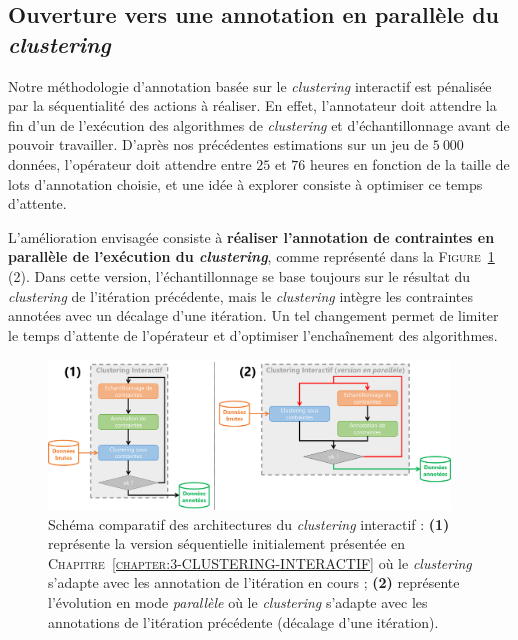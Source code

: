 		\subsection{Ouverture vers une annotation en parallèle du \textit{clustering}}
		
			Notre méthodologie d'annotation basée sur le \textit{clustering} interactif est pénalisée par la séquentialité des actions à réaliser.
			En effet, l'annotateur doit attendre la fin d'un de l'exécution des algorithmes de \textit{clustering} et d'échantillonnage avant de pouvoir travailler.
			D'après nos précédentes estimations sur un jeu de $5~000$ données, l'opérateur doit attendre entre $25$ et $76$ heures en fonction de la taille de lots d'annotation choisie, et une idée à explorer consiste à optimiser ce temps d'attente.
			
			L'amélioration envisagée consiste à \textbf{réaliser l'annotation de contraintes en parallèle de l'exécution du \textit{clustering}}, comme représenté dans la \textsc{Figure~\ref{figure:4.3.4-ETUDE-COUT-TOTAL-ARCHITECTURE}} (2).
			Dans cette version, l'échantillonnage se base toujours sur le résultat du \textit{clustering} de l'itération précédente, mais le \textit{clustering} intègre les contraintes annotées avec un décalage d'une itération.
			Un tel changement permet de limiter le temps d'attente de l'opérateur et d'optimiser l’enchaînement des algorithmes.

			\begin{figure}[!htb]
				\centering
				\includegraphics[width=0.95\textwidth]{figures/interactive-clustering-architecture-sequentielle-vs-parallele}
				\caption{
					Schéma comparatif des architectures du \textit{clustering} interactif : \textbf{(1)} représente la version séquentielle initialement présentée en \textsc{Chapitre~\ref{chapter:3-CLUSTERING-INTERACTIF}} où le \textit{clustering} s'adapte avec les annotation de l'itération en cours ; \textbf{(2)} représente l'évolution en mode \textit{parallèle} où le \textit{clustering} s'adapte avec les annotations de l'itération précédente (décalage d'une itération).
				}
				\label{figure:4.3.4-ETUDE-COUT-TOTAL-ARCHITECTURE}
			\end{figure}
			
